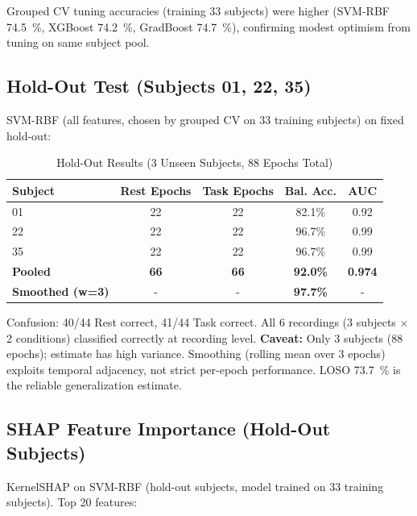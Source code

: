 \documentclass[conference]{IEEEtran}
\begin{document}
Grouped CV tuning accuracies (training 33 subjects) were higher (SVM-RBF \SI{74.5}{\%}, XGBoost \SI{74.2}{\%}, GradBoost \SI{74.7}{\%}), confirming modest optimism from tuning on same subject pool.

\subsection{Hold-Out Test (Subjects 01, 22, 35)}
\label{sec:holdout}
SVM-RBF (all features, chosen by grouped CV on 33 training subjects) on fixed hold-out:

\begin{table}[htbp]
\caption{Hold-Out Results (3 Unseen Subjects, 88 Epochs Total)}
\label{tab:holdout}
\centering
\begin{tabular}{@{}lcccc@{}}
\toprule
Subject & Rest Epochs & Task Epochs & Bal. Acc. & AUC \\
\midrule
01 & 22 & 22 & 82.1\% & 0.92 \\
22 & 22 & 22 & 96.7\% & 0.99 \\
35 & 22 & 22 & 96.7\% & 0.99 \\
\midrule
\textbf{Pooled} & \textbf{66} & \textbf{66} & \textbf{92.0\%} & \textbf{0.974} \\
\textbf{Smoothed (w=3)} & - & - & \textbf{97.7\%} & - \\
\bottomrule
\end{tabular}
\end{table}

Confusion: 40/44 Rest correct, 41/44 Task correct. All 6 recordings (3 subjects $\times$ 2 conditions) classified correctly at recording level. \textbf{Caveat:} Only \num{3} subjects (\num{88} epochs); estimate has high variance. Smoothing (rolling mean over 3 epochs) exploits temporal adjacency, not strict per-epoch performance. LOSO \SI{73.7}{\%} is the reliable generalization estimate.

\subsection{SHAP Feature Importance (Hold-Out Subjects)}
\label{sec:shap}
KernelSHAP on SVM-RBF (hold-out subjects, model trained on 33 training subjects). Top 20 features:
\end{document}

